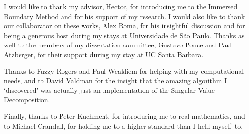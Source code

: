\begin{acknowledgements}

I would like to thank my advisor, Hector, for introducing me to the Immersed Boundary Method and for his support of my research. I would also like to thank our collaborator on these works, Alex Roma, for his insightful discussion and for being a generous host during my stays at Universidade de S\~ao Paulo. Thanks as well to the members of my dissertation committee, Gustavo Ponce and Paul Atzberger, for their support during my stay at UC Santa Barbara.

Thanks to Fuzzy Rogers and Paul Weakliem for helping with my computational needs, and to David Valdman for the insight that the amazing algorithm I `discovered' was actually just an implementation of the Singular Value Decomposition.

Finally, thanks to Peter Kuchment, for introducing me to real mathematics, and to Michael Crandall, for holding me to a higher standard than I held myself~to.

\end{acknowledgements}
